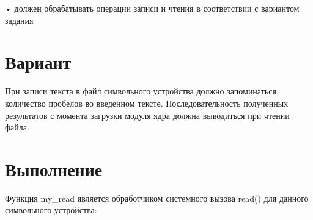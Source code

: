 \documentclass{article}
\begin{document}
• должен обрабатывать операции записи и чтения в соответствии с
вариантом задания

\section{Вариант}

При записи текста в файл символьного устройства должно
запоминаться количество пробелов во введенном тексте.
Последовательность полученных результатов с момента
загрузки модуля ядра должна выводиться при чтении файла.

\section{Выполнение}

Функция my\_read является обработчиком системного вызова read() для данного символьного устройства:
\end{document}
